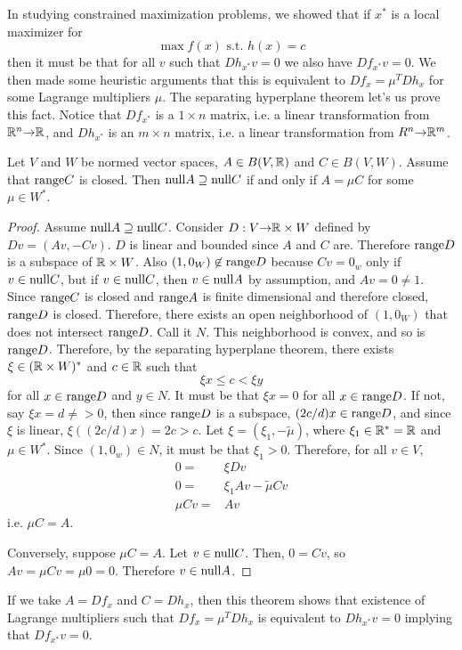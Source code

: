 In studying constrained maximization problems, we showed that if $x^*$
is a local maximizer for 
\[ \max f(x) \text{ s.t. } h(x) = c \]
then it must be that for all $v$ such that $Dh_{x^*} v = 0$ we also have
$Df_{x^*} v = 0$. We then made some heuristic arguments that this is
equivalent to $Df_x = \mu^T Dh_x$ for some Lagrange multipliers
$\mu$. The separating hyperplane theorem let's us prove this
fact. Notice that $Df_{x^*}$ is a $1 \times n$ matrix, i.e. a linear
transformation from $\mathbb{R}^n {\rightarrow} \mathbb{R}$, and $Dh_{x^*}$ is an $m \times n$
matrix, i.e. a linear transformation from $R^n {\rightarrow} \mathbb{R}^m$. 
\begin{theorem}\label{thm:multipliers}
  Let $V$ and $W$ be normed vector spaces, $A \in B(V,\mathbb{R})$ and
  $C \in B(V,W)$. Assume that $\mathrm{range} C$ is closed. Then
  $\mathrm{null} A \supseteq \mathrm{null} C$ if and only if $A = \mu C$ for some
  $\mu \in W^*$.
\end{theorem}
\begin{proof}
  Assume $\mathrm{null} A \supseteq \mathrm{null} C$. Consider $D:V {\rightarrow} \mathbb{R} \times W$
  defined by $Dv = (Av, -Cv)$. $D$ is linear and bounded since $A$ and
  $C$ are.  Therefore $\mathrm{range} D$ is a subspace of $\mathbb{R} \times W$. Also
  $(1,0_W) \not\in \mathrm{range} D$ because $Cv = 0_w$ only if
  $v \in \mathrm{null} C$, but if $v \in \mathrm{null} C$, then $v \in \mathrm{null} A$ by
  assumption, and $Av = 0 \neq 1$. Since $\mathrm{range} C$ is closed and
  $\mathrm{range} A$ is finite dimensional and therefore closed, $\mathrm{range} D$ is
  closed. Therefore, there exists an open neighborhood of $(1,0_W)$
  that does not intersect $\mathrm{range} D$. Call it $N$. This neighborhood
  is convex, and so is $\mathrm{range} D$. Therefore, by the separating
  hyperplane theorem, there exists $\xi \in (\mathbb{R} \times W)^*$ and
  $c \in \mathbb{R}$ such that
  \[ \xi x \leq c < \xi y \]
  for all $x \in \mathrm{range} D$ and $y \in N$.  It must be that $\xi x = 0$
  for all $x \in \mathrm{range} D$. If not, say $\xi x = d \neq >0$, then
  since $\mathrm{range} D$ is a subspace, $(2c/d) x \in \mathrm{range} D$, and since
  $\xi$ is linear, $\xi((2c/d) x) = 2c > c$.  Let
  $\xi = (\xi_1, -\tilde{\mu})$, where $\xi_1 \in \mathbb{R}^* = \mathbb{R}$ and
  $\mu \in W^*$. Since $(1,0_w) \in N$, it must be that $\xi_1 >
  0$. Therefore, for all $v \in V$,
  \begin{align*}
    0 = & \xi Dv \\
    0 = & \xi_1 Av - \tilde{\mu} Cv \\
    \mu C v = & Av 
  \end{align*}
  i.e. $\mu C = A$.

  Conversely, suppose $\mu C = A$. Let $v \in \mathrm{null} C$. Then, 
  $ 0 = C v $, so $A v = \mu C v = \mu 0 = 0$. Therefore $v \in \mathrm{null} A$.
\end{proof}
If we take $A = Df_x$ and $C = Dh_x$, then this theorem shows that
existence of Lagrange multipliers such that $Df_x = \mu^T Dh_x$ is
equivalent to $Dh_{x^*} v = 0$ implying that $Df_{x^*} v = 0$. 

